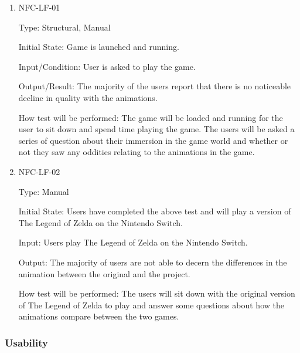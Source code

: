 \documentclass[12pt, titlepage]{article}
\begin{document}
\begin{enumerate}
	
	\item{NFC-LF-01\\}
	
	Type: Structural, Manual 
	
	Initial State: Game is launched and running.
	
	Input/Condition: User is asked to play the game.
	
	Output/Result: The majority of the users report that there is no noticeable decline in quality with the animations.
	
	How test will be performed: The game will be loaded and running for the user to sit down and spend time playing the game. The users will be asked a series of question about their immersion in the game world and whether or not they saw any oddities relating to the animations in the game.
	
	\item{NFC-LF-02\\}
	
	Type: Manual
	
	Initial State: Users have completed the above test and will play a version of The Legend of Zelda on the Nintendo Switch.
	
	Input: Users play The Legend of Zelda on the Nintendo Switch.
	
	Output: The majority of users are not able to decern the differences in the animation between the original and the project.
	
	How test will be performed: The users will sit down with the original version of The Legend of Zelda to play and answer some questions about how the animations compare between the two games.
	
\end{enumerate}

\subsubsection{Usability}
\end{document}
